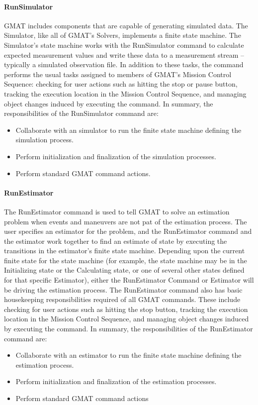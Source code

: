 \paragraph{RunSimulator}   GMAT includes components that are capable of generating simulated
data.  The Simulator, like all of GMAT's Solvers, implements a finite state machine.  The
Simulator's
state machine works with the RunSimulator command to calculate expected measurement values
and write these data to a measurement stream -- typically a simulated observation file.  In addition
to these tasks, the command performs the usual tasks assigned to members of GMAT's Mission
Control Sequence: checking for user actions such as hitting the stop or pause button, tracking the
execution location in the Mission Control Sequence, and managing object changes induced by
executing the command.  In summary, the responsibilities of the RunSimulator command are:
\begin{itemize}
\item Collaborate with an simulator to run the finite state machine defining the simulation process.
\item Perform initialization and finalization of the simulation processes.
\item Perform standard GMAT command actions.
\end{itemize}

\paragraph{RunEstimator}  The RunEstimator command is used to tell GMAT to solve an estimation
problem when events and maneuvers are not pat of the estimation process.  The user specifies an
estimator for the problem, and the RunEstimator command and the estimator work together to find an
estimate of state by executing the transitions in the estimator's finite state machine.  Depending
upon
the current finite state for the state machine (for example, the state machine may be in the
Initializing
state or the Calculating state, or one of several other states defined for that specific Estimator),
either
the RunEstimator Command or Estimator will be driving the estimation process. The RunEstimator
command also has basic housekeeping responsibilities required of all GMAT commands.  These
include checking for user actions such as hitting the stop button, tracking the execution location
in the
Mission Control Sequence, and managing object changes induced by executing the command.  In
summary, the responsibilities of the RunEstimator command are:
\begin{itemize}
\item Collaborate with an estimator to run the finite state machine defining the estimation process.
\item Perform initialization and finalization of the estimation processes.
\item Perform standard GMAT command actions
\end{itemize}


